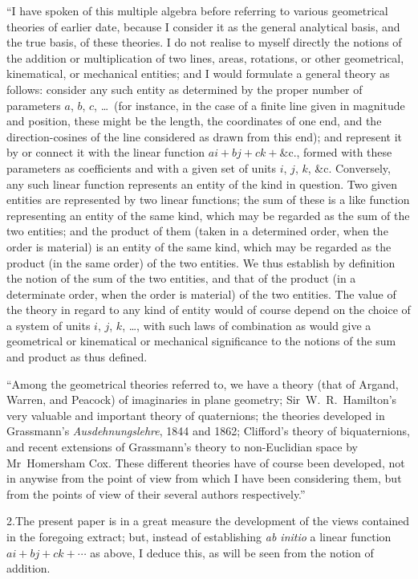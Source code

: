 \documentclass[11pt]{article}
\begin{document}
``I have spoken of this multiple algebra before referring to various geometrical theories of earlier date, because I consider it as the general analytical basis, and the true basis, of these theories. I do not realise to myself directly the notions of the addition or multiplication of two lines, areas, rotations, or other geometrical, kinematical, or mechanical entities; and I would formulate a general theory as follows: consider any such entity as determined by the proper number of parameters $a$, $b$, $c$, \ldots\ (for instance, in the case of a finite line given in magnitude and position, these might be the length, the coordinates of one end, and the direction-cosines of the line considered as drawn from this end); and represent it by or connect it with the linear function $ai + bj + ck + \&\mathrm{c}.$, formed with these parameters as coefficients and with a given set of units $i$, $j$, $k$, \&c. Conversely, any such linear function represents an entity of the kind in question. Two given entities are represented by two linear functions; the sum of these is a like function representing an entity of the same kind, which may be regarded as the sum of the two entities; and the product of them (taken in a determined order, when the order is material) is an entity of the same kind, which may be regarded as the product (in the same order) of the two entities. We thus establish by definition the notion of the sum of the two entities, and that of the product (in a determinate order, when the order is material) of the two entities. The value of the theory in regard to any kind of entity would of course depend on the choice of a system of units $i$, $j$, $k$, \ldots, with such laws of combination as would give a geometrical or kinematical or mechanical significance to the notions of the sum and product as thus defined.

``Among the geometrical theories referred to, we have a theory (that of Argand, Warren, and Peacock) of imaginaries in plane geometry; Sir~W.~R.~Hamilton's very valuable and important theory of quaternions; the theories developed in Grassmann's \textit{Ausdehnungslehre}, 1844 and 1862; Clifford's theory of biquaternions, and recent extensions of Grassmann's theory to non-Euclidian space by Mr~Homersham Cox. These different theories have of course been developed, not in anywise from the point of view from which I have been considering them, but from the points of view of their several authors respectively.''

2.\quad The present paper is in a great measure the development of the views contained in the foregoing extract; but, instead of establishing \textit{ab initio} a linear function $ai + bj + ck + \cdots$ as above, I deduce this, as will be seen from the notion of addition.
\end{document}
